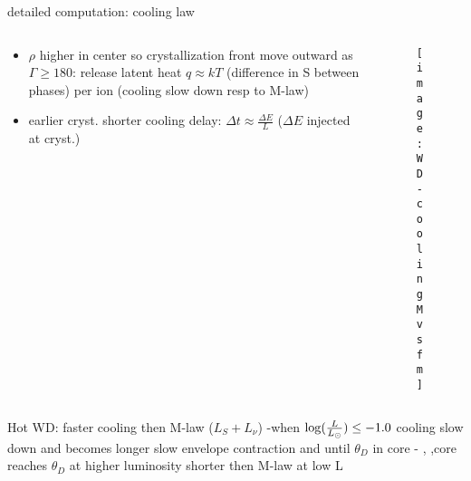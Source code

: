 \begin{frame}{detailed computation: cooling law}
\begin{columns}[T]
	\begin{column}{0.5\textwidth}
		\begin{itemize}
			\item $\rho$ higher in center so crystallization front move outward as $\Gamma\geq180$: release latent heat $q\approx kT$ (difference in S between phases) per ion (cooling slow down resp to M-law)
			\item earlier cryst. shorter cooling delay: $\Delta t\approx\frac{\Delta E}{L}$ ($\Delta E$ injected at cryst.)
		\end{itemize}
	\end{column}
	\begin{column}{0.5\textwidth}
		\begin{figure}[!ht]
			\texttt{[image: WD-coolingMvsfm]}\label{fig:WD-coolingMvsfm}
		\end{figure}
\end{column}\end{columns}
Hot WD: faster cooling then M-law ($L_S+L_{\nu}$) -when $\log(\frac{L}{L_{\odot}})\leq-1.0$ cooling slow down and becomes longer slow envelope contraction and  until $\theta_D$ in core - , ,core reaches $\theta_D$ at higher luminosity  shorter then M-law at low L
\end{frame}


